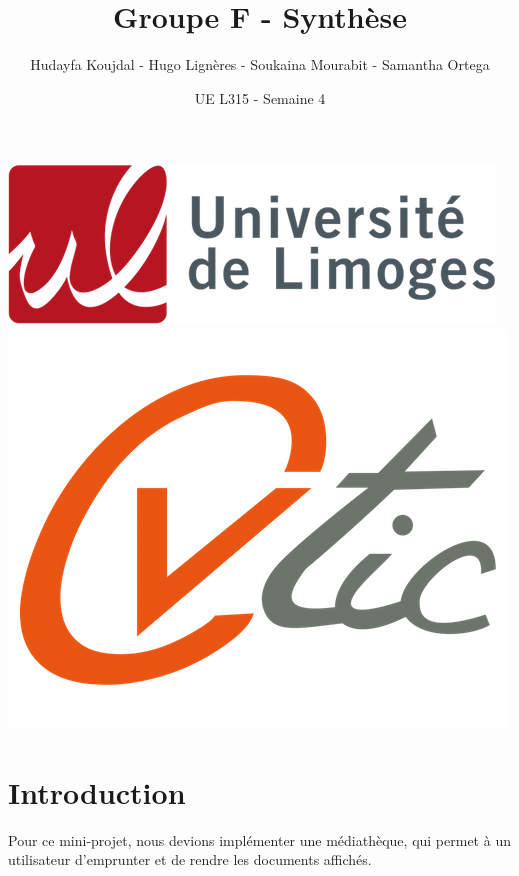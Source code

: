 \documentclass[12pt,a4paper]{article}
\title{Groupe F - Synthèse}
\author{Hudayfa Koujdal - Hugo Lignères - Soukaina Mourabit - Samantha Ortega}
\date{UE L315 - Semaine 4}
\begin{document}
\maketitle

\hrulefill
\vspace{6cm}
\begin{center}
	\includegraphics[scale=.4]{../images/univ.png}
		\\
		\vspace{2cm}
	\includegraphics[scale=.25]{../images/cvtic.png}
\end{center}

\newpage

\tableofcontents

\newpage

\section{Introduction}

Pour ce mini-projet, nous devions implémenter une médiathèque, qui permet à un utilisateur d'emprunter et de rendre les documents affichés. 
\end{document}
